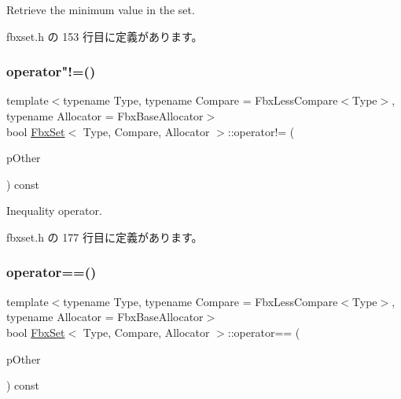 Retrieve the minimum value in the set. 



 fbxset.\+h の 153 行目に定義があります。

\mbox{\label{class_fbx_set_ab1734439d5a1bb4b4e2c6bd45b18ecd2}} 
\subsubsection{\texorpdfstring{operator"!=()}{operator!=()}}
{\footnotesize\ttfamily template$<$typename Type, typename Compare = Fbx\+Less\+Compare$<$\+Type$>$, typename Allocator = Fbx\+Base\+Allocator$>$ \\
bool \hyperlink{class_fbx_set}{Fbx\+Set}$<$ Type, Compare, Allocator $>$\+::operator!= (\begin{DoxyParamCaption}\item[{const \hyperlink{class_fbx_set}{Fbx\+Set}$<$ Type, Compare, Allocator $>$ \&}]{p\+Other }\end{DoxyParamCaption}) const\hspace{0.3cm}{\ttfamily [inline]}}



Inequality operator. 



 fbxset.\+h の 177 行目に定義があります。

\mbox{\label{class_fbx_set_a69388720587c95840cc36384f33a9484}} 
\subsubsection{\texorpdfstring{operator==()}{operator==()}}
{\footnotesize\ttfamily template$<$typename Type, typename Compare = Fbx\+Less\+Compare$<$\+Type$>$, typename Allocator = Fbx\+Base\+Allocator$>$ \\
bool \hyperlink{class_fbx_set}{Fbx\+Set}$<$ Type, Compare, Allocator $>$\+::operator== (\begin{DoxyParamCaption}\item[{const \hyperlink{class_fbx_set}{Fbx\+Set}$<$ Type, Compare, Allocator $>$ \&}]{p\+Other }\end{DoxyParamCaption}) const\hspace{0.3cm}{\ttfamily [inline]}}



